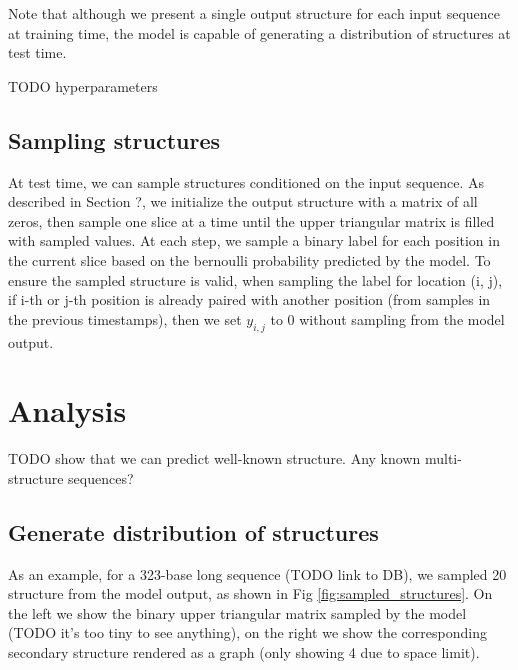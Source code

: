 \documentclass{article}
\begin{document}
Note that although we present a single output structure for each input sequence at training time,
the model is capable of generating a distribution of structures at test time.

TODO hyperparameters





\subsection{Sampling structures}

At test time, we can sample structures conditioned on the input sequence.
As described in Section ?, we initialize the output structure with a matrix of all zeros,
then sample one slice at a time until the upper triangular matrix is filled with sampled values.
At each step, we sample a binary label for each position in the current slice based on the
bernoulli probability predicted by the model.
To ensure the sampled structure is valid, when sampling the label for location (i, j),
if i-th or j-th position is already paired with another position (from samples in the previous timestamps),
then we set $y_{i, j}$ to $0$ without sampling from the model output.

\section{Analysis}

TODO show that we can predict well-known structure.
Any known multi-structure sequences?

\subsection{Generate distribution of structures}

As an example, for a 323-base long sequence (TODO link to DB),
we sampled 20 structure from the model output, as shown in Fig \ref{fig:sampled_structures}.
On the left we show the binary upper triangular matrix sampled by the model (TODO it's too tiny to see anything),
on the right we show the corresponding secondary structure rendered as a graph (only showing 4 due to space limit).
\end{document}
